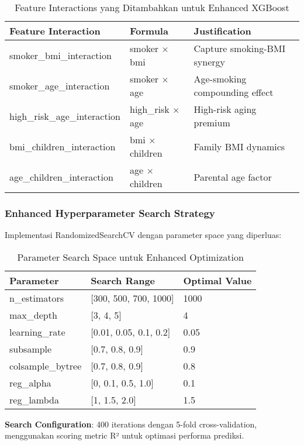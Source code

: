 \begin{table}[H]
\centering
\caption{Feature Interactions yang Ditambahkan untuk Enhanced XGBoost}
\label{tab:enhanced-features}
\begin{tabular}{|l|l|l|}
\hline
\textbf{Feature Interaction} & \textbf{Formula} & \textbf{Justification} \\
\hline
smoker\_bmi\_interaction & smoker $\times$ bmi & Capture smoking-BMI synergy \\
smoker\_age\_interaction & smoker $\times$ age & Age-smoking compounding effect \\
high\_risk\_age\_interaction & high\_risk $\times$ age & High-risk aging premium \\
bmi\_children\_interaction & bmi $\times$ children & Family BMI dynamics \\
age\_children\_interaction & age $\times$ children & Parental age factor \\
\hline
\end{tabular}
\end{table}

\subsubsection{Enhanced Hyperparameter Search Strategy}
Implementasi RandomizedSearchCV dengan parameter space yang diperluas:

\begin{table}[H]
\centering
\caption{Parameter Search Space untuk Enhanced Optimization}
\label{tab:enhanced-search-space}
\begin{tabular}{|l|l|l|}
\hline
\textbf{Parameter} & \textbf{Search Range} & \textbf{Optimal Value} \\
\hline
n\_estimators & [300, 500, 700, 1000] & 1000 \\
max\_depth & [3, 4, 5] & 4 \\
learning\_rate & [0.01, 0.05, 0.1, 0.2] & 0.05 \\
subsample & [0.7, 0.8, 0.9] & 0.9 \\
colsample\_bytree & [0.7, 0.8, 0.9] & 0.8 \\
reg\_alpha & [0, 0.1, 0.5, 1.0] & 0.1 \\
reg\_lambda & [1, 1.5, 2.0] & 1.5 \\
\hline
\end{tabular}
\end{table}

\textbf{Search Configuration}: 400 iterations dengan 5-fold cross-validation, menggunakan scoring metric R² untuk optimasi performa prediksi.

